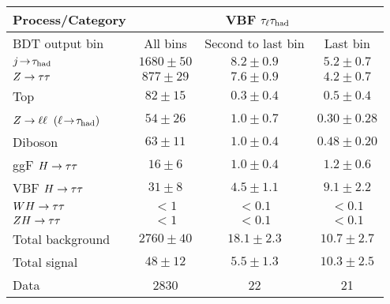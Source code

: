 \begin{tabular}{l|ccc}
  Process/Category  & \multicolumn{3}{c}{VBF $\tau_\ell\tau_\text{had}$} \\
  \hline
  BDT output bin    & All bins      & Second to last bin & Last bin    \\
  \hline
  $j\!\rightarrow\!\tau_\text{had}$          & $1680 \pm 50$ & $ 8.2 \pm 0.9$ & $5.2  \pm 0.7$  \\
  $Z\rightarrow\tau\tau$        & $ 877 \pm 29$ & $ 7.6 \pm 0.9$ & $4.2  \pm 0.7$  \\
  Top               & $  82 \pm 15$ & $ 0.3 \pm 0.4$ & $0.5  \pm 0.4$  \\
  $Z \rightarrow \ell\ell$ $(\ell\!\rightarrow\!\tau_\text{had})$ & $  54 \pm 26$ & $ 1.0 \pm 0.7$ & $0.30 \pm 0.28$ \\
  Diboson           & $  63 \pm 11$ & $ 1.0 \pm 0.4$ & $0.48 \pm 0.20$ \\
  \hline
  ggF $H\rightarrow\tau\tau$    & $  16 \pm 6$  & $ 1.0 \pm 0.4$ & $1.2  \pm 0.6$  \\
  VBF $H\rightarrow\tau\tau$    & $  31 \pm 8$  & $ 4.5 \pm 1.1$ & $9.1  \pm 2.2$  \\
  $WH\rightarrow\tau\tau$       & $ < 1$        & $< 0.1$        & $< 0.1$         \\
  $ZH\rightarrow\tau\tau$       & $ < 1$        & $< 0.1$        & $< 0.1$         \\
  \hline
  Total background  & $2760 \pm 40$ & $18.1 \pm 2.3$ & $10.7 \pm 2.7$  \\
  Total signal      & $  48 \pm 12$ & $ 5.5 \pm 1.3$ & $10.3 \pm 2.5$  \\
  \hline
  Data              & 2830          & 22             & 21             \\
\end{tabular}

